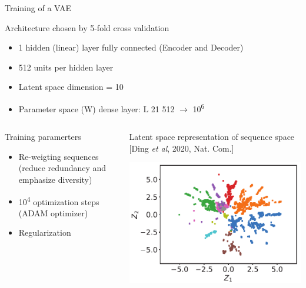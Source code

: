 \documentclass[presentation,smaller]{beamer}
\begin{document}
\begin{frame}[label={sec:org1b6ec9e}]{Training of a VAE}
\begin{block}{Architecture chosen by 5-fold cross validation}
\begin{itemize}
\item 1 \texttimes{} hidden (linear) layer fully connected (Encoder and Decoder)
\item 512 units per hidden layer
\item Latent space dimension = 10
\item Parameter space (W) dense layer: L \texttimes{} 21 \texttimes{} 512 \(\rightarrow\) 10\textsuperscript{6}
\end{itemize}
\end{block}
\begin{columns}
\begin{column}{0.5\columnwidth}
\begin{block}{Training paramerters}
\begin{itemize}
\item Re-weigting sequences (reduce redundancy and emphasize diversity)
\item 10\textsuperscript{4} optimization steps (ADAM optimizer)
\item Regularization
\end{itemize}
\end{block}
\end{column}

\begin{column}{0.5\columnwidth}
\begin{block}{Latent space representation of sequence space}
[Ding \emph{et al}, 2020, Nat. Com.]
\begin{center}
\includegraphics[width=.9\linewidth]{img/proj_prot_ding.png}
\end{center}
\end{block}
\end{column}
\end{columns}
\end{frame}
\end{document}

